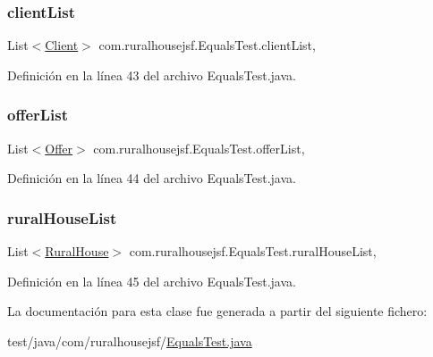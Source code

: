 \subsubsection{\texorpdfstring{clientList}{clientList}}
{\footnotesize\ttfamily List$<$\mbox{\hyperlink{classcom_1_1ruralhousejsf_1_1domain_1_1_client}{Client}}$>$ com.\+ruralhousejsf.\+Equals\+Test.\+client\+List\hspace{0.3cm}{\ttfamily [static]}, {\ttfamily [package]}}



Definición en la línea 43 del archivo Equals\+Test.\+java.

\mbox{\label{classcom_1_1ruralhousejsf_1_1_equals_test_abf5b3398125f0ed991c84afb429512f4}} 
\subsubsection{\texorpdfstring{offerList}{offerList}}
{\footnotesize\ttfamily List$<$\mbox{\hyperlink{classcom_1_1ruralhousejsf_1_1domain_1_1_offer}{Offer}}$>$ com.\+ruralhousejsf.\+Equals\+Test.\+offer\+List\hspace{0.3cm}{\ttfamily [static]}, {\ttfamily [package]}}



Definición en la línea 44 del archivo Equals\+Test.\+java.

\mbox{\label{classcom_1_1ruralhousejsf_1_1_equals_test_a9bdc3ab9b2c103383f6c34f253fe8307}} 
\subsubsection{\texorpdfstring{ruralHouseList}{ruralHouseList}}
{\footnotesize\ttfamily List$<$\mbox{\hyperlink{classcom_1_1ruralhousejsf_1_1domain_1_1_rural_house}{Rural\+House}}$>$ com.\+ruralhousejsf.\+Equals\+Test.\+rural\+House\+List\hspace{0.3cm}{\ttfamily [static]}, {\ttfamily [package]}}



Definición en la línea 45 del archivo Equals\+Test.\+java.



La documentación para esta clase fue generada a partir del siguiente fichero\+:\begin{DoxyCompactItemize}
\item 
test/java/com/ruralhousejsf/\mbox{\hyperlink{_equals_test_8java}{Equals\+Test.\+java}}\end{DoxyCompactItemize}
